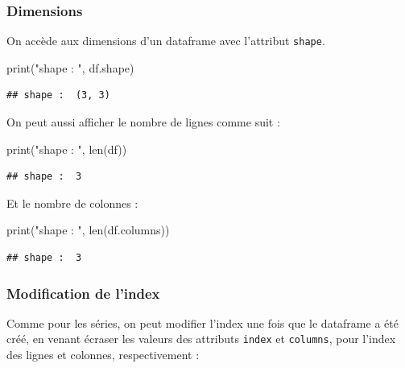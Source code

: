 \documentclass[12pt,]{book}
\newenvironment{Shaded}{\begin{snugshade}}{\end{snugshade}}
\newcommand{\StringTok}[1]{\textcolor[rgb]{0.31,0.60,0.02}{#1}}
\newcommand{\BuiltInTok}[1]{#1}
\newcommand{\NormalTok}[1]{#1}
\numberwithin{equation}{section}
\numberwithin{countremarque}{section}
\begin{document}
\subsubsection{Dimensions}\label{dimensions-1}

On accède aux dimensions d'un dataframe avec l'attribut \texttt{shape}.

\begin{Shaded}
\begin{Highlighting}[]
\BuiltInTok{print}\NormalTok{(}\StringTok{"shape : "}\NormalTok{, df.shape)}
\end{Highlighting}
\end{Shaded}

\begin{lstlisting}
## shape :  (3, 3)
\end{lstlisting}

On peut aussi afficher le nombre de lignes comme suit :

\begin{Shaded}
\begin{Highlighting}[]
\BuiltInTok{print}\NormalTok{(}\StringTok{"shape : "}\NormalTok{, }\BuiltInTok{len}\NormalTok{(df))}
\end{Highlighting}
\end{Shaded}

\begin{lstlisting}
## shape :  3
\end{lstlisting}

Et le nombre de colonnes :

\begin{Shaded}
\begin{Highlighting}[]
\BuiltInTok{print}\NormalTok{(}\StringTok{"shape : "}\NormalTok{, }\BuiltInTok{len}\NormalTok{(df.columns))}
\end{Highlighting}
\end{Shaded}

\begin{lstlisting}
## shape :  3
\end{lstlisting}

\subsubsection{Modification de l'index}\label{modification-de-lindex}

Comme pour les séries, on peut modifier l'index une fois que le
dataframe a été créé, en venant écraser les valeurs des attributs
\texttt{index} et \texttt{columns}, pour l'index des lignes et colonnes,
respectivement :
\end{document}
